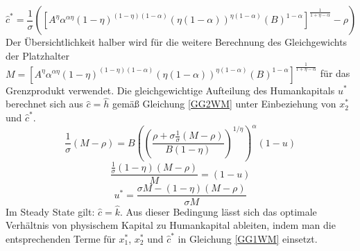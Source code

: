 \begin{equation}
\boxed{\hat{c}^*=\frac{1}{\sigma}\left(\left[A^\eta\alpha^{\alpha\eta}(1-\eta)^{(1-\eta)(1-\alpha)}(\eta(1-\alpha))^{\eta(1-\alpha)}(B)^{1-\alpha}\right]^\frac{1}{1+\eta-\alpha}-\rho\right)}
\end{equation}
Der Übersichtlichkeit halber wird für die weitere Berechnung des Gleichgewichts der Platzhalter $M=\left[A^\eta\alpha^{\alpha\eta}(1-\eta)^{(1-\eta)(1-\alpha)}(\eta(1-\alpha))^{\eta(1-\alpha)}(B)^{1-\alpha}\right]^\frac{1}{1+\eta-\alpha}$ für das Grenzprodukt verwendet.
Die gleichgewichtige Aufteilung des Humankapitals $u^*$ berechnet sich aus $\hat{c}=\hat{h}$ gemä{\ss} Gleichung \eqref{GG2WM} unter Einbeziehung von $x_2^*$ und $\hat{c}^*$. 
\begin{equation}
\frac{1}{\sigma} (M-\rho)=B\left(\left(\frac{\rho+\sigma\frac{1}{\sigma}(M-\rho)}{B(1-\eta)}\right)^{1/\eta}\right)^\alpha(1-u)
\end{equation}
\begin{equation*}
\frac{\frac{1}{\sigma}(1-\eta)(M-\rho)}{M}=(1-u)
\end{equation*}
\begin{equation}
\boxed{u^*=\frac{\sigma M-(1-\eta)(M-\rho)}{\sigma M}}
\end{equation}
Im Steady State gilt: $\hat{c}=\hat{k}$. Aus dieser Bedingung lässt sich das optimale Verhältnis von physischem Kapital zu Humankapital ableiten, indem man die entsprechenden Terme für $x_1^*$, $x_2^*$ und $\hat{c}^*$  in Gleichung \eqref{GG1WM} einsetzt. 

